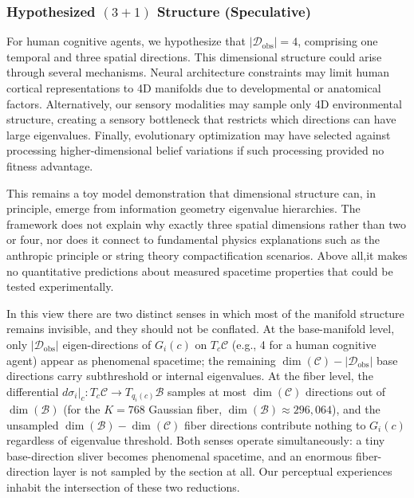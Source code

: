 \documentclass[11pt]{article}
\begin{document}
\subsubsection{Hypothesized $(3+1)$ Structure (Speculative)}

For human cognitive agents, we hypothesize that $|\mathcal{D}_{\text{obs}}| = 4$, comprising one temporal and three spatial directions. This dimensional structure could arise through several mechanisms. Neural architecture constraints may limit human cortical representations to 4D manifolds due to developmental or anatomical factors. Alternatively, our sensory modalities may sample only 4D environmental structure, creating a sensory bottleneck that restricts which directions can have large eigenvalues. Finally, evolutionary optimization may have selected against processing higher-dimensional belief variations if such processing provided no fitness advantage.

This remains a toy model demonstration that dimensional structure can, in principle, emerge from information geometry eigenvalue hierarchies. The framework does not explain why exactly three spatial dimensions rather than two or four, nor does it connect to fundamental physics explanations such as the anthropic principle or string theory compactification scenarios. Above all,it makes no quantitative predictions about measured spacetime properties that could be tested experimentally.

In this view there are two distinct senses in which most of the manifold structure remains invisible, and they should not be conflated. At the base-manifold level, only $|\mathcal{D}_{\text{obs}}|$ eigen-directions of $G_i(c)$ on $T_c\mathcal{C}$ (e.g., 4 for a human cognitive agent) appear as phenomenal spacetime; the remaining $\dim(\mathcal{C}) - |\mathcal{D}_{\text{obs}}|$ base directions carry subthreshold or internal eigenvalues. At the fiber level, the differential $d\sigma_i|_c: T_c\mathcal{C} \to T_{q_i(c)}\mathcal{B}$ samples at most $\dim(\mathcal{C})$ directions out of $\dim(\mathcal{B})$ (for the $K = 768$ Gaussian fiber, $\dim(\mathcal{B}) \approx 296{,}064$), and the unsampled $\dim(\mathcal{B}) - \dim(\mathcal{C})$ fiber directions contribute nothing to $G_i(c)$ regardless of eigenvalue threshold. Both senses operate simultaneously: a tiny base-direction sliver becomes phenomenal spacetime, and an enormous fiber-direction layer is not sampled by the section at all. Our perceptual experiences inhabit the intersection of these two reductions.
\end{document}
